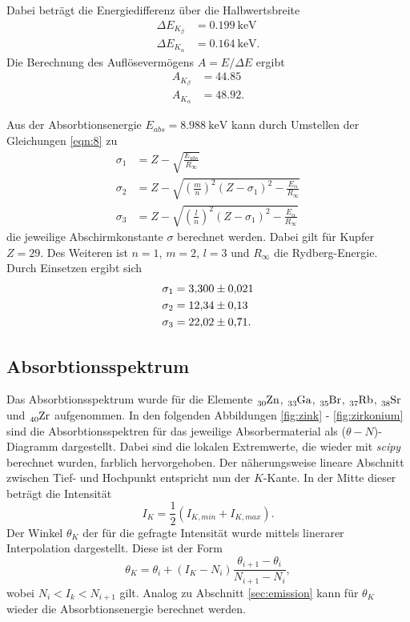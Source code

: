\noindent
Dabei beträgt die Energiedifferenz über die Halbwertsbreite
\begin{align*}
    \Delta E_{K_\beta}  &= \SI{0.199}{\kilo\electronvolt}\\
    \Delta E_{K_\alpha} &= \SI{0.164}{\kilo\electronvolt}   .
\end{align*}
Die Berechnung des Auflösevermögens $A=E/\Delta E$ ergibt
\begin{align*}
    A_{K_\beta}  &= \num{44.85}\\
    A_{K_\alpha} &= \num{48.92} .
\end{align*}

Aus der Absorbtionsenergie $E_{abs}=\SI{8.988}{\kilo\electronvolt}$ \cite{AP04} kann durch Umstellen der Gleichungen \eqref{eqn:8} zu
\begin{align*}
    \sigma_1&=Z-\sqrt{\frac{E_{abs}}{R_\infty}}\\
    \sigma_2&=Z-\sqrt{\left(\frac{m}{n}\right)^2(Z-\sigma_1)^2-\frac{E_\alpha}{R_\infty}}\\
    \sigma_3&=Z-\sqrt{\left(\frac{l}{n}\right)^2(Z-\sigma_1)^2-\frac{E_\alpha}{R_\infty}}
\end{align*}
die jeweilige Abschirmkonstante $\sigma$ berechnet werden. Dabei gilt für Kupfer $Z=\num{29}$. Des Weiteren ist $n=1$, $m=2$, $l=3$
und $R_\infty$ die Rydberg-Energie. Durch Einsetzen ergibt sich
\begin{align*}
    \sigma_1&=\num{3.30  \pm 0.021}\\
    \sigma_2&=\num{12.34 \pm 0.13 }\\
    \sigma_3&=\num{22.02 \pm 0.71 }   .
\end{align*}

\subsection{Absorbtionsspektrum}
\label{sec:absorb}
Das Absorbtionsspektrum wurde für die Elemente $\ce{_{30}Zn}$, $\ce{_{33}Ga}$, $\ce{_{35}Br}$, $\ce{_{37}Rb}$, $\ce{_{38}Sr}$ und
$\ce{_{40}Zr}$ aufgenommen. In den folgenden Abbildungen \ref{fig:zink} - \ref{fig:zirkonium} sind die Absorbtionsspektren für das jeweilige
Absorbermaterial als ($\theta-N$)-Diagramm dargestellt. Dabei sind die lokalen Extremwerte, die wieder mit \textit{scipy} \cite{scipy}
berechnet wurden, farblich hervorgehoben. Der näherungsweise lineare Abschnitt zwischen Tief- und Hochpunkt entspricht nun der
$K$-Kante. In der Mitte dieser beträgt die Intensität
\begin{equation*}
    I_K=\frac{1}{2}(I_{K,min}+I_{K,max})   .
\end{equation*}
Der Winkel $\theta_K$ der für die gefragte Intensität wurde mittels linerarer Interpolation dargestellt. Diese ist der Form
\begin{equation*}
    \theta_K=\theta_i+(I_K-N_i)\frac{\theta_{i+1}-\theta_i}{N_{i+1}-N_i},
\end{equation*}
wobei $N_i<I_k<N_{i+1}$ gilt. Analog zu Abschnitt \ref{sec:emission} kann für $\theta_K$ wieder die Absorbtionsenergie berechnet werden.


